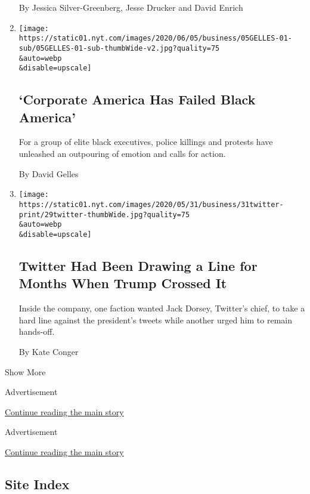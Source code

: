 \begin{enumerate}
  By Jessica Silver-Greenberg, Jesse Drucker and David Enrich
\item
  \href{/2020/06/06/business/corporate-america-has-failed-black-america.html}{}

  \texttt{[image: https://static01.nyt.com/images/2020/06/05/business/05GELLES-01-sub/05GELLES-01-sub-thumbWide-v2.jpg?quality=75\\\&auto=webp\\\&disable=upscale]}

  \hypertarget{corporate-america-has-failed-black-america}{%
  \subsection{`Corporate America Has Failed Black
  America'}\label{corporate-america-has-failed-black-america}}

  For a group of elite black executives, police killings and protests
  have unleashed an outpouring of emotion and calls for action.

  By David Gelles
\item
  \href{/2020/05/30/technology/twitter-trump-dorsey.html}{}

  \texttt{[image: https://static01.nyt.com/images/2020/05/31/business/31twitter-print/29twitter-thumbWide.jpg?quality=75\\\&auto=webp\\\&disable=upscale]}

  \hypertarget{twitter-had-been-drawing-a-line-for-months-when-trump-crossed-it}{%
  \subsection{Twitter Had Been Drawing a Line for Months When Trump
  Crossed
  It}\label{twitter-had-been-drawing-a-line-for-months-when-trump-crossed-it}}

  Inside the company, one faction wanted Jack Dorsey, Twitter's chief,
  to take a hard line against the president's tweets while another urged
  him to remain hands-off.

  By Kate Conger
\end{enumerate}

Show More

Advertisement

\protect\hyperlink{after-mid2}{Continue reading the main story}

Advertisement

\protect\hyperlink{after-mktg}{Continue reading the main story}

\hypertarget{site-index}{%
\subsection{Site Index}\label{site-index}}

